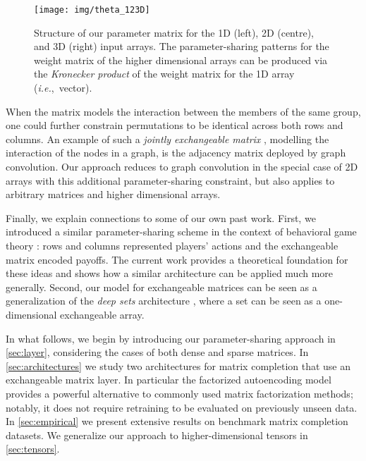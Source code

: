 \documentclass{article}
\newcommand{\ie}[0]{\emph{i.e.},~}
\theoremstyle{definition}
\begin{document}
\begin{figure}[t]\centering
\texttt{[image: img/theta\_123D]}
\caption{Structure of our parameter matrix for the 1D (left), 2D (centre), and 3D (right) input arrays. 
The parameter-sharing patterns for the weight matrix of the higher dimensional arrays can be produced via the \textit{Kronecker product} of the weight matrix for the 1D array (\ie vector).}
\label{fig:parameter_matrix}
\end{figure}



When the matrix models the interaction between the members of the same group, one could further constrain permutations to be identical across both rows and columns. 
An example of such a \textit{jointly exchangeable matrix} \mbox{\citep{orbanz2015bayesian}}, modelling the interaction of the nodes in a graph, is the adjacency matrix deployed by graph convolution. Our approach reduces to graph convolution in the special case of 2D arrays with this additional parameter-sharing constraint, but also applies to arbitrary matrices and higher dimensional arrays.






Finally, we explain connections to some of our own past work. First, we introduced a similar parameter-sharing scheme in the context of behavioral game theory \citep{hartford2016deep}: rows and columns represented players' actions and the exchangeable matrix encoded payoffs. The current work provides a theoretical foundation for these ideas and shows how a similar architecture can be applied much more generally. Second, our model for exchangeable matrices can be seen as a generalization of the \emph{deep sets} architecture \citep{zaheer_deepsets}, where a set can be seen as a one-dimensional exchangeable array. 

In what follows, we begin by introducing our parameter-sharing approach in \cref{sec:layer}, considering the cases of both dense and sparse matrices.
In \cref{sec:architectures} we study two architectures for matrix completion that use an exchangeable matrix layer. In particular
the factorized autoencoding model provides a powerful alternative to commonly used matrix factorization methods; notably, it does not require retraining to be evaluated on previously unseen data.
In \cref{sec:empirical} we present extensive results on benchmark matrix completion datasets. We generalize our approach to higher-dimensional tensors in \cref{sec:tensors}. 
\end{document}
